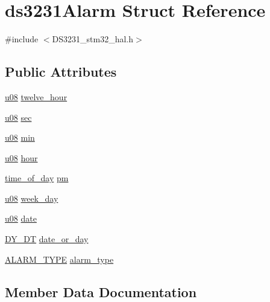 \hypertarget{structds3231Alarm}{}\section{ds3231\+Alarm Struct Reference}
\label{structds3231Alarm}


{\ttfamily \#include $<$D\+S3231\+\_\+stm32\+\_\+hal.\+h$>$}

\subsection*{Public Attributes}
\begin{DoxyCompactItemize}
\item 
\hyperlink{main_8h_ae2b6b8613a28b013c8c7fdaf93cdb1e1}{u08} \hyperlink{structds3231Alarm_a206a78c872094a2b29a9de7b758f5a6d}{twelve\+\_\+hour}
\item 
\hyperlink{main_8h_ae2b6b8613a28b013c8c7fdaf93cdb1e1}{u08} \hyperlink{structds3231Alarm_a0e7f1bac1543fd4b07f520475dbaed8b}{sec}
\item 
\hyperlink{main_8h_ae2b6b8613a28b013c8c7fdaf93cdb1e1}{u08} \hyperlink{structds3231Alarm_a39c40bbf0330038f7a0c4e4604e64f6a}{min}
\item 
\hyperlink{main_8h_ae2b6b8613a28b013c8c7fdaf93cdb1e1}{u08} \hyperlink{structds3231Alarm_a7e9a65a7c3ab95487b1aafab5f4367e9}{hour}
\item 
\hyperlink{DS3231__stm32__hal_8h_ab6153795b3885e1d0215e3c26f302eea}{time\+\_\+of\+\_\+day} \hyperlink{structds3231Alarm_a5a7965959880bef167f10a9629ba2e53}{pm}
\item 
\hyperlink{main_8h_ae2b6b8613a28b013c8c7fdaf93cdb1e1}{u08} \hyperlink{structds3231Alarm_ad6a342ecb299dc1b06d197f6cbf8bef1}{week\+\_\+day}
\item 
\hyperlink{main_8h_ae2b6b8613a28b013c8c7fdaf93cdb1e1}{u08} \hyperlink{structds3231Alarm_aecf62d17878445c9e55ad2504d506d98}{date}
\item 
\hyperlink{DS3231__stm32__hal_8h_af98f0d3260c36c79a1457ac2acde6f13}{D\+Y\+\_\+\+DT} \hyperlink{structds3231Alarm_a2b3c65f1eeff84a05e4ac80af4d844d3}{date\+\_\+or\+\_\+day}
\item 
\hyperlink{DS3231__stm32__hal_8h_a7d33379f6dff123738a82d85ea2b876a}{A\+L\+A\+R\+M\+\_\+\+T\+Y\+PE} \hyperlink{structds3231Alarm_a7a79c0355f11b11e516534f16db5bf43}{alarm\+\_\+type}
\end{DoxyCompactItemize}


\subsection{Member Data Documentation}
\mbox{\label{structds3231Alarm_a7a79c0355f11b11e516534f16db5bf43}} 
